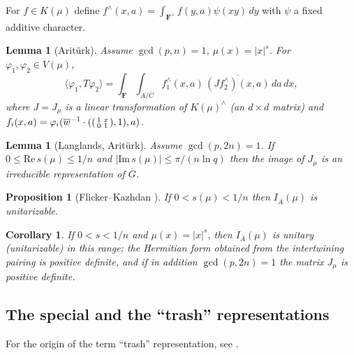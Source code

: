 \documentclass[12pt,letterpaper]{article}
\newtheorem{proposition}[theorem]{Proposition}
\newtheorem{lemma}[theorem]{Lemma}
\newtheorem{corollary}[theorem]{Corollary}
\theoremstyle{definition}
\theoremstyle{remark}
\newcommand{\F}{\mathbf{F}}
\newcommand{\bG}{\overline{G}}
\newcommand{\bA}{\overline{A}}
\newcommand{\bC}{\overline{C}}
\newcommand{\bw}{\overline{w}}
\newcommand{\vphi}{\varphi}
\newcommand{\verify}[1]{\textit{[verification pending: #1]}}
\begin{document}
For $f\in K(\mu)$ define $f^\wedge(x,a)=\int_{\F^\times}f(y,a)\psi(xy)\,dy$ with $\psi$ a fixed additive
character.
\begin{lemma}[Arit\"urk]\label{lemma:Jdef}
Assume $\gcd(p,n)=1$, $\mu(x)=|x|^s$. For $\vphi_1,\vphi_2\in V(\mu)$,
\[
\langle\vphi_1,T\vphi_2\rangle=\int_{\F}\int_{\bA/\bC}f_1^\wedge(x,a)\,\overline{(Jf_2^\wedge)(x,a)}\,da\,dx,
\]
where $J=J_\mu$ is a linear transformation of $K(\mu)^\wedge$ (an $d\times d$ matrix) and
$f_i(x,a)=\vphi_i(\bw^{-1}\cdot(\begin{psmallmatrix}1&x\\0&1\end{psmallmatrix},1),a)$.
\end{lemma}

\begin{lemma}[Langlands, Arit\"urk] Assume $\gcd(p,2n)=1$. If $0\le\mathrm{Re}\,s(\mu)\le1/n$ and
$|\mathrm{Im}\,s(\mu)|\le\pi/(n\ln q)$ then the image of $J_\mu$ is an irreducible representation of $\bG$.\end{lemma}
\begin{proposition}[Flicker--Kazhdan \cite{FK86}]\label{prop:fk}
If $0<s(\mu)<1/n$ then $I_{\bA}(\mu)$ is unitarizable.\end{proposition}
\begin{corollary}
If $0<s<1/n$ and $\mu(x)=|x|^s$, then $I_{\bA}(\mu)$ is unitary (unitarizable) in this range; the Hermitian
form obtained from the intertwining pairing is positive definite, and if in addition $\gcd(p,2n)=1$ the
matrix $J_\mu$ is positive definite.
\end{corollary}

\subsection{The special and the ``trash'' representations}\label{subsec:special}

For the origin of the term ``trash'' representation, see \cite{Ge76}.
\end{document}

